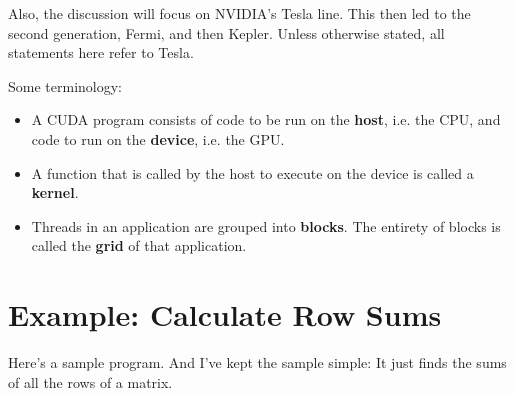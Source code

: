 Also, the discussion will focus on NVIDIA's Tesla line.  This then led
to the second generation, Fermi, and then Kepler.  Unless otherwise
stated, all statements here refer to Tesla.

Some terminology: 

\begin{itemize}

\item A CUDA program consists of code to be run on the {\bf host}, i.e.
the CPU, and code to run on the {\bf device}, i.e. the GPU.

\item A function that is called by the host to execute on the device is
called a {\bf kernel}.

\item Threads in an application are grouped into {\bf blocks}.  The
entirety of blocks is called the {\bf grid} of that application.  

\end{itemize}

\section{Example:  Calculate Row Sums}

Here's a sample program.  And I've kept the sample simple:  It just
finds the sums of all the rows of a matrix.  

